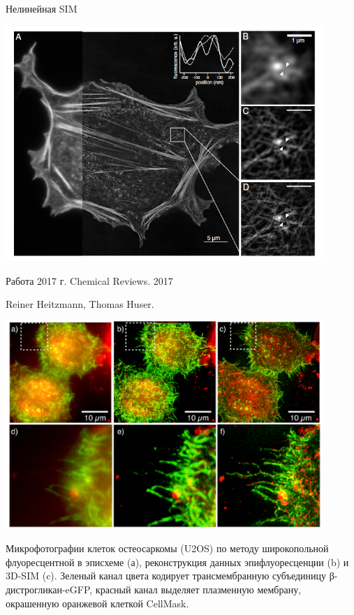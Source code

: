 \documentclass[9pt, compress, xcolor=table]{beamer}
\begin{document}
\begin{frame}{Нелинейная SIM}
\begin{center}
\includegraphics[width=0.9\textwidth]{nlsim12}
\end{center}
\end{frame}


\begin{frame}{Работа 2017 г.}
Chemical Reviews. 2017

Reiner Heitzmann, Thomas Huser.
\begin{center}
\includegraphics[width=0.9\textwidth]{sim_2017.png}

Микрофотографии клеток остеосаркомы (U2OS) по методу широкопольной флуоресцентной в  эписхеме (а), реконструкция
данных эпифлуоресценции (b) и 3D-SIM (c). Зеленый канал цвета кодирует трансмембранную субъединицу β-дистрогликан-eGFP, красный 
канал выделяет плазменную мембрану, окрашенную оранжевой клеткой CellMask. 

\end{center}
\end{frame}
\end{document}
